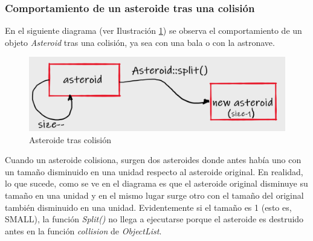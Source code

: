 \subsubsection{Comportamiento de un asteroide tras una colisión}
En el siguiente diagrama (ver Ilustración \ref{asteroid}) se observa el comportamiento de un objeto \emph{Asteroid} tras una colisión, ya sea con una bala o con la astronave.

\begin{figure}[H]
    \centering
    \includegraphics[width=\textwidth]{fotos/asteroid.png}
    \caption{Asteroide tras colisión}
    \label{asteroid}
\end{figure}

Cuando un asteroide colisiona, surgen dos asteroides donde antes había uno con un tamaño disminuido en una unidad respecto al asteroide original. En realidad, lo que sucede, como se ve en el diagrama es que el asteroide original disminuye su tamaño en una unidad y en el mismo lugar surge otro con el tamaño del original también disminuido en una unidad. Evidentemente si el tamaño es 1 (esto es, SMALL), la función \emph{Split()} no llega a ejecutarse porque el asteroide es destruido antes en la función \emph{collision} de \emph{ObjectList}.